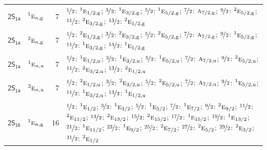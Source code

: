 \documentclass[10pt,a4paper]{article}
\numberwithin{equation}{section}
\newcommand{\grp}[1]{\mathsf{#1}}
\newcommand{\irr}[1]{\text{\normalfont\scshape #1}}
\newcommand{\conjpair}[1]{{}^{#1}}
\newcommand{\ptag}[1]{\mathrm{#1}}
\newlength{\fillwidth}\newlength{\cellwidth}\newlength{\colwidth}
\begin{document}
{\begin{longtable}{@{}llr>{\RaggedRight\arraybackslash}p{\fillwidth}@{}}
\href{2S14.pdf}{$\grp{2S_{14}}$} & $\conjpair{1}\irr{e}_{n,\ptag{g}}$ & 7 & $\nicefrac{1}{2}$: $\conjpair{1}\irr{e}_{1/2,\ptag{g}}$; $\nicefrac{3}{2}$: $\conjpair{1}\irr{e}_{3/2,\ptag{g}}$; $\nicefrac{5}{2}$: $\conjpair{1}\irr{e}_{5/2,\ptag{g}}$; $\nicefrac{7}{2}$: $\irr{a}_{7/2,\ptag{g}}$; $\nicefrac{9}{2}$: $\conjpair{2}\irr{e}_{5/2,\ptag{g}}$; $\nicefrac{11}{2}$: $\conjpair{2}\irr{e}_{3/2,\ptag{g}}$; $\nicefrac{13}{2}$: $\conjpair{2}\irr{e}_{1/2,\ptag{g}}$\\
\href{2S14.pdf}{$\grp{2S_{14}}$} & $\conjpair{2}\irr{e}_{n,\ptag{g}}$ & 7 & $\nicefrac{1}{2}$: $\conjpair{2}\irr{e}_{1/2,\ptag{g}}$; $\nicefrac{3}{2}$: $\conjpair{2}\irr{e}_{3/2,\ptag{g}}$; $\nicefrac{5}{2}$: $\conjpair{2}\irr{e}_{5/2,\ptag{g}}$; $\nicefrac{7}{2}$: $\irr{a}_{7/2,\ptag{g}}$; $\nicefrac{9}{2}$: $\conjpair{1}\irr{e}_{5/2,\ptag{g}}$; $\nicefrac{11}{2}$: $\conjpair{1}\irr{e}_{3/2,\ptag{g}}$; $\nicefrac{13}{2}$: $\conjpair{1}\irr{e}_{1/2,\ptag{g}}$\\
\href{2S14.pdf}{$\grp{2S_{14}}$} & $\conjpair{1}\irr{e}_{n,\ptag{u}}$ & 7 & $\nicefrac{1}{2}$: $\conjpair{1}\irr{e}_{1/2,\ptag{u}}$; $\nicefrac{3}{2}$: $\conjpair{1}\irr{e}_{3/2,\ptag{u}}$; $\nicefrac{5}{2}$: $\conjpair{1}\irr{e}_{5/2,\ptag{u}}$; $\nicefrac{7}{2}$: $\irr{a}_{7/2,\ptag{u}}$; $\nicefrac{9}{2}$: $\conjpair{2}\irr{e}_{5/2,\ptag{u}}$; $\nicefrac{11}{2}$: $\conjpair{2}\irr{e}_{3/2,\ptag{u}}$; $\nicefrac{13}{2}$: $\conjpair{2}\irr{e}_{1/2,\ptag{u}}$\\
\href{2S14.pdf}{$\grp{2S_{14}}$} & $\conjpair{2}\irr{e}_{n,\ptag{u}}$ & 7 & $\nicefrac{1}{2}$: $\conjpair{2}\irr{e}_{1/2,\ptag{u}}$; $\nicefrac{3}{2}$: $\conjpair{2}\irr{e}_{3/2,\ptag{u}}$; $\nicefrac{5}{2}$: $\conjpair{2}\irr{e}_{5/2,\ptag{u}}$; $\nicefrac{7}{2}$: $\irr{a}_{7/2,\ptag{u}}$; $\nicefrac{9}{2}$: $\conjpair{1}\irr{e}_{5/2,\ptag{u}}$; $\nicefrac{11}{2}$: $\conjpair{1}\irr{e}_{3/2,\ptag{u}}$; $\nicefrac{13}{2}$: $\conjpair{1}\irr{e}_{1/2,\ptag{u}}$\\
\href{2S16.pdf}{$\grp{2S_{16}}$} & $\conjpair{1}\irr{e}_{n,\ptag{g}}$ & 16 & $\nicefrac{1}{2}$: $\conjpair{1}\irr{e}_{1/2}$; $\nicefrac{3}{2}$: $\conjpair{1}\irr{e}_{3/2}$; $\nicefrac{5}{2}$: $\conjpair{1}\irr{e}_{5/2}$; $\nicefrac{7}{2}$: $\conjpair{1}\irr{e}_{7/2}$; $\nicefrac{9}{2}$: $\conjpair{2}\irr{e}_{9/2}$; $\nicefrac{11}{2}$: $\conjpair{2}\irr{e}_{11/2}$; $\nicefrac{13}{2}$: $\conjpair{2}\irr{e}_{13/2}$; $\nicefrac{15}{2}$: $\conjpair{2}\irr{e}_{15/2}$; $\nicefrac{17}{2}$: $\conjpair{1}\irr{e}_{15/2}$; $\nicefrac{19}{2}$: $\conjpair{1}\irr{e}_{13/2}$; $\nicefrac{21}{2}$: $\conjpair{1}\irr{e}_{11/2}$; $\nicefrac{23}{2}$: $\conjpair{1}\irr{e}_{9/2}$; $\nicefrac{25}{2}$: $\conjpair{2}\irr{e}_{7/2}$; $\nicefrac{27}{2}$: $\conjpair{2}\irr{e}_{5/2}$; $\nicefrac{29}{2}$: $\conjpair{2}\irr{e}_{3/2}$; $\nicefrac{31}{2}$: $\conjpair{2}\irr{e}_{1/2}$\\

\end{longtable}}
\end{document}
